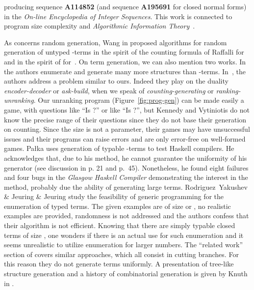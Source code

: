 \documentclass{jfp1}
\begin{document}
  producing sequence \textbf{A114852} (and sequence \textbf{A195691} for closed
  normal forms) in the \emph{On-line Encyclopedia of Integer Sequences}.  This work
  is connected to program size complexity and \emph{Algorithmic Information
    Theory}~\cite{261084}.

  As concerns random generation, Wang in
  \cite{Wang05generatingrandom,wang04:_effic_gener_random_progr_their_applic}
  proposed algorithms for random generation of untyped -terms in the spirit of the
  counting formula of Raffalli for~\cite{Wang05generatingrandom} and in the spirit of
   for~\cite{wang04:_effic_gener_random_progr_their_applic}.  On term
  generation, we can also mention two works. In \cite{DBLP:conf/haskell/DuregardJW12}
  the authors enumerate and generate many more structures than
  -terms. In~\cite{DBLP:journals/jfp/KennedyV12}, the authors address a problem
  similar to ours. Indeed they play on the duality \emph{encoder-decoder} or
  \emph{ask-build}, when we speak of \emph{counting-generating} or
  \emph{ranking-unranking}.  Our unranking program (Figure~\ref{fig:prog-gen}) can be
  made easily a game, with questions like ``Is ?'' or like
  ``Is ?'', but Kennedy and Vytiniotis do not know the precise
  range of their questions since they do not base their generation on counting. Since
  the size is not a parameter, their games may have unsuccessful issues and their
  programs can raise errors and are only error-free on well-formed games.  Pa{\l}ka
  \cite{palka12:_testin_compil,Palka:2011:TOC:1982595.1982615} uses generation of
  typable -terms to test Haskell compilers.  He acknowledges that, due to his
  method, he cannot guarantee the uniformity of his generator (see discussion in
  \cite{palka12:_testin_compil} p. 21 and p.~45).  Nonetheless, he found eight
  failures and four bugs in the \emph{Glasgow Haskell Compiler} demonstrating the
  interest in the method, probably due the ability of generating large terms. \ifJFP
  {Rodriguez~Yakushev} \& Jeuring   \& Jeuring
  \cite{DBLP:conf/aaip/YakushevJ09} \fi study the feasibility of generic
  programming for the enumeration of typed terms. The given examples are of size 
  or , no realistic examples are provided, randomness is not addressed and the
  authors confess that their algorithm is not efficient.  Knowing that there are
  simply typable closed terms of size , one wonders if there is an
  actual use for such enumeration and it seems unrealistic to utilize enumeration for
  larger numbers.  The ``related work'' section of \cite{DBLP:conf/aaip/YakushevJ09}
  covers similar approaches, which all consist in cutting branches.  For this reason
  they do not generate terms uniformly.  A presentation of tree-like structure
  generation and a history of combinatorial generation is given \ifJFP by Knuth
  \else in \cite{KnuthTAOCP_4_4}\fi.
\end{document}
